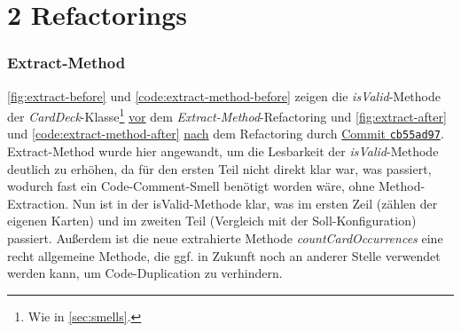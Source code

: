 




\section{2 Refactorings}

\subsubsection{Extract-Method}

\autoref{fig:extract-before} und \autoref{code:extract-method-before} zeigen die \textit{isValid}-Methode 
der \textit{CardDeck}-Klasse\footnote{Wie in \autoref{sec:smells}.}
\underline{vor} dem \textit{Extract-Method}-Refactoring und \autoref{fig:extract-after} und \autoref{code:extract-method-after} \underline{nach}
dem Refactoring durch \underline{Commit \texttt{cb55ad97}}. \\
Extract-Method wurde hier angewandt, um die Lesbarkeit der \textit{isValid}-Methode deutlich zu erhöhen, da für den 
ersten Teil nicht direkt klar war, was passiert, wodurch fast ein Code-Comment-Smell benötigt worden wäre, ohne Method-Extraction. 
Nun ist in der isValid-Methode klar, was im ersten Zeil (zählen der eigenen Karten) und im zweiten Teil (Vergleich mit der Soll-Konfiguration) 
passiert. Außerdem ist die neue extrahierte Methode \textit{countCardOccurrences} eine recht allgemeine Methode, die ggf. in Zukunft 
noch an anderer Stelle verwendet werden kann, um Code-Duplication zu verhindern. 


